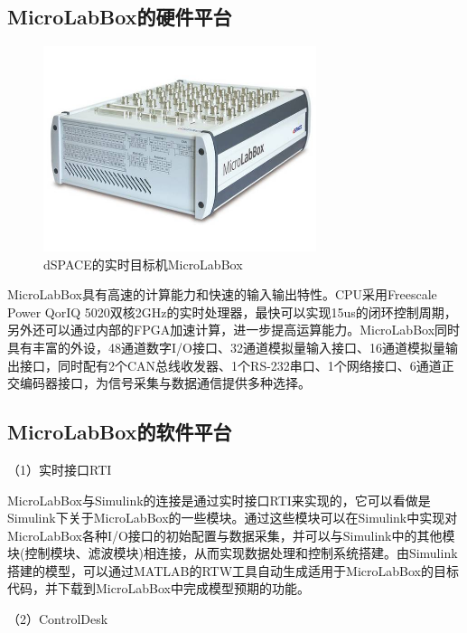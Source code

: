 \subsection{MicroLabBox的硬件平台}
\begin{figure}[htb]
    \includegraphics[width=8cm]{fig/f21.jpeg}
    \caption{dSPACE的实时目标机MicroLabBox}
    \label{fig:mark}
\end{figure}

MicroLabBox具有高速的计算能力和快速的输入输出特性。CPU采用Freescale Power QorIQ 5020双核2GHz的实时处理器，最快可以实现15us的闭环控制周期，另外还可以通过内部的FPGA加速计算，进一步提高运算能力。MicroLabBox同时具有丰富的外设，48通道数字I/O接口、32通道模拟量输入接口、16通道模拟量输出接口，同时配有2个CAN总线收发器、1个RS-232串口、1个网络接口、6通道正交编码器接口，为信号采集与数据通信提供多种选择。

\subsection{MicroLabBox的软件平台}
（1）实时接口RTI

MicroLabBox与Simulink的连接是通过实时接口RTI来实现的，它可以看做是Simulink下关于MicroLabBox的一些模块。通过这些模块可以在Simulink中实现对MicroLabBox各种I/O接口的初始配置与数据采集，并可以与Simulink中的其他模块(控制模块、滤波模块)相连接，从而实现数据处理和控制系统搭建。由Simulink搭建的模型，可以通过MATLAB的RTW工具自动生成适用于MicroLabBox的目标代码，并下载到MicroLabBox中完成模型预期的功能。

（2）ControlDesk

